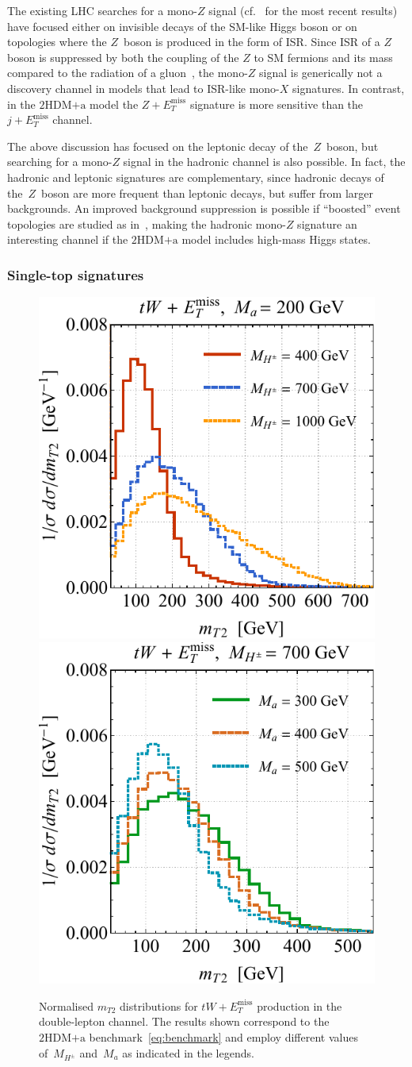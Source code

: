 \documentclass[review]{elsarticle}
\newcommand{\MET}{\ensuremath{E_T^\mathrm{miss}}\xspace}
\newcommand{\ma}{\ensuremath{M_{a}}\xspace}
\newcommand{\mHc}{\ensuremath{M_{H^{\pm}}}\xspace}
\newcommand{\hdma}{\ensuremath{\textrm{2HDM+a}}\xspace}
\begin{document}
The existing LHC searches for a mono-$Z$ signal (cf.~\cite{Aaboud:2017bja,Sirunyan:2017qfc} for the most recent results) have focused either on invisible decays of the SM-like Higgs boson or on topologies where the $Z$~boson is produced in the form of ISR.  Since ISR of a $Z$ boson is suppressed by both the coupling of the $Z$ to SM fermions and its mass compared to the radiation of a gluon~\cite{Petriello:2008pu,Bell:2012rg,Carpenter:2012rg}, the mono-$Z$ signal is generically not a discovery channel in models that lead to ISR-like mono-$X$ signatures. In contrast, in the \hdma model the $Z+\MET$ signature is more sensitive than the $j+\MET$ channel.

The above discussion has focused on the leptonic decay of the~$Z$~boson, but searching for a mono-$Z$ signal in the hadronic channel is also possible. In fact, the hadronic and leptonic signatures  are complementary, since hadronic decays of the~$Z$~boson are more frequent than leptonic decays, but suffer from larger backgrounds. An improved background suppression is possible if ``boosted'' event topologies are studied as in~\cite{Aad:2013oja,Sirunyan:2017jix}, making the hadronic mono-$Z$ signature an interesting channel if the \hdma model includes high-mass Higgs states. 

\subsubsection{Single-top signatures}

\begin{figure}[t!]
\centering
\includegraphics[height=0.45\textwidth]{mt2l.pdf} \qquad 
\includegraphics[height=0.45\textwidth]{mt2r.pdf}
\vspace{2mm}
\caption{\label{fig:mt2spectra} Normalised $m_{T2}$ distributions for $tW+\MET$ production in the double-lepton channel.  The  results shown correspond to the \hdma benchmark~\eqref{eq:benchmark} and employ different values of~$\mHc$ and~$\ma$ as indicated in the legends.}
\end{figure}
\end{document}
